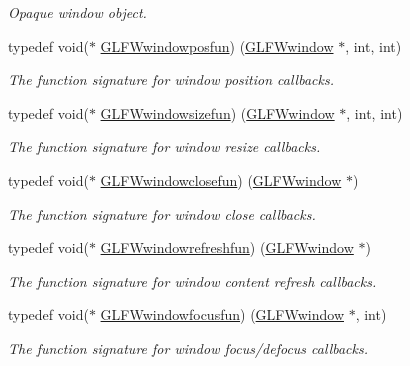 \begin{DoxyCompactItemize}
\begin{DoxyCompactList}\small\item\em Opaque window object. \end{DoxyCompactList}\item 
typedef void($\ast$ \hyperlink{group__window_gafd8db81fdb0e850549dc6bace5ed697a}{G\+L\+F\+Wwindowposfun}) (\hyperlink{group__window_ga3c96d80d363e67d13a41b5d1821f3242}{G\+L\+F\+Wwindow} $\ast$, int, int)
\begin{DoxyCompactList}\small\item\em The function signature for window position callbacks. \end{DoxyCompactList}\item 
typedef void($\ast$ \hyperlink{group__window_gae49ee6ebc03fa2da024b89943a331355}{G\+L\+F\+Wwindowsizefun}) (\hyperlink{group__window_ga3c96d80d363e67d13a41b5d1821f3242}{G\+L\+F\+Wwindow} $\ast$, int, int)
\begin{DoxyCompactList}\small\item\em The function signature for window resize callbacks. \end{DoxyCompactList}\item 
typedef void($\ast$ \hyperlink{group__window_ga93e7c2555bd837f4ed8b20f76cada72e}{G\+L\+F\+Wwindowclosefun}) (\hyperlink{group__window_ga3c96d80d363e67d13a41b5d1821f3242}{G\+L\+F\+Wwindow} $\ast$)
\begin{DoxyCompactList}\small\item\em The function signature for window close callbacks. \end{DoxyCompactList}\item 
typedef void($\ast$ \hyperlink{group__window_ga7a56f9e0227e2cd9470d80d919032e08}{G\+L\+F\+Wwindowrefreshfun}) (\hyperlink{group__window_ga3c96d80d363e67d13a41b5d1821f3242}{G\+L\+F\+Wwindow} $\ast$)
\begin{DoxyCompactList}\small\item\em The function signature for window content refresh callbacks. \end{DoxyCompactList}\item 
typedef void($\ast$ \hyperlink{group__window_ga58be2061828dd35080bb438405d3a7e2}{G\+L\+F\+Wwindowfocusfun}) (\hyperlink{group__window_ga3c96d80d363e67d13a41b5d1821f3242}{G\+L\+F\+Wwindow} $\ast$, int)
\begin{DoxyCompactList}\small\item\em The function signature for window focus/defocus callbacks. \end{DoxyCompactList}\item 

\end{DoxyCompactItemize}
